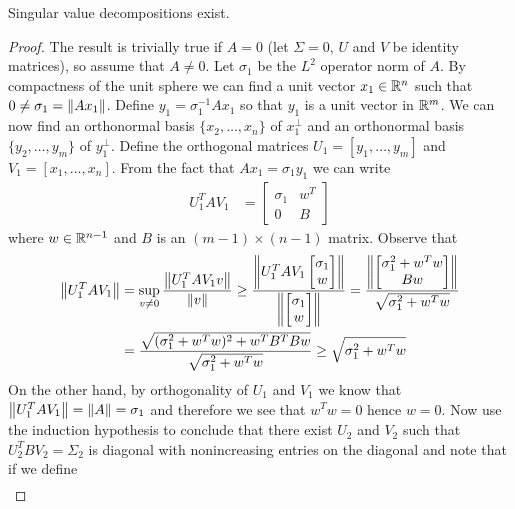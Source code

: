 \begin{thm}\label{SingularValueDecomposition}Singular value decompositions exist.
\end{thm}
\begin{proof}
The result is trivially true if $A = 0$ (let $\Sigma=0$, $U$ and $V$ be identity matrices), so assume that $A \neq 0$.  Let $\sigma_1$ be the $L^2$ operator norm of $A$.   By compactness of the unit sphere we can find a unit vector $x_1 \in \mathbb{R}^n$ such that $0 \neq \sigma_1 = \left \lVert Ax_1 \right \rVert$.  Define $y_1 = \sigma^{-1}_1 Ax_1$ so that $y_1$ is a unit vector in $\mathbb{R}^m$.  We can now find an orthonormal basis $\lbrace x_2, \dotsc, x_n \rbrace$ of $x_1^{\perp}$ and an orthonormal basis $\lbrace y_2, \dotsc, y_m \rbrace$ of $y_1^{\perp}$.  Define the orthogonal matrices $U_1 = [y_1, \dotsc, y_m]$ and $V_1 = [x_1, \dotsc, x_n]$.  From the fact that $Ax_1 = \sigma_1 y_1$ we can write 
\begin{align*}
U_1^T A V_1 &=
\begin{bmatrix}
\sigma_1 & w^T \\
0 & B
\end{bmatrix}
\end{align*}
where $w \in \mathbb{R}^{n-1}$ and $B$ is an $(m-1) \times (n-1)$ matrix.
Observe that
\begin{align*}
\left \lVert U_1^T A V_1 \right \rVert &= \sup_{v \neq 0} \frac{\left \lVert U_1^T A V_1 v \right \rVert}{\left \lVert v \right \rVert} \geq \frac{\left \lVert U_1^T A V_1 \begin{bmatrix} \sigma_1 \\ w\end{bmatrix} \right \rVert}{\left \lVert \begin{bmatrix} \sigma_1 \\ w\end{bmatrix} \right \rVert} 
=\frac{\left \lVert \begin{bmatrix} \sigma_1^2 + w^T w \\ 
B w
 \end{bmatrix} \right \rVert}{\sqrt{\sigma_1^2 + w^T w}} \\
&= \frac{\sqrt{(\sigma_1^2 + w^T w )^2 + w^TB^TBw}}{\sqrt{\sigma_1^2 + w^T w}} \geq \sqrt{\sigma_1^2 + w^T w}
\end{align*}
On the other hand, by orthogonality of $U_1$ and $V_1$ we know that
$\left \lVert U_1^T A V_1 \right \rVert = \left \lVert A \right \rVert = \sigma_1$ and therefore we see that $w^Tw = 0$ hence $w = 0$.    
Now use the induction hypothesis to conclude that there exist $U_2$ and $V_2$ such that
$U_2^T B V_2 = \Sigma_2$ is diagonal with nonincreasing entries on the diagonal and note that if we define 
\begin{align*}

\end{align*}
\end{proof}
